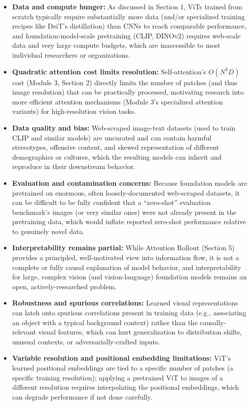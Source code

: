 \documentclass[12pt,a4paper]{article}
\begin{document}
\begin{itemize}[leftmargin=1.5em]
    \item \textbf{Data and compute hunger:} As discussed in Section 1, ViTs trained from scratch typically require substantially more data (and/or specialized training recipes like DeiT's distillation) than CNNs to reach comparable performance, and foundation-model-scale pretraining (CLIP, DINOv2) requires web-scale data and very large compute budgets, which are inaccessible to most individual researchers or organizations.
    \item \textbf{Quadratic attention cost limits resolution:} Self-attention's $O(N^2D)$ cost (Module 3, Section 2) directly limits the number of patches (and thus image resolution) that can be practically processed, motivating research into more efficient attention mechanisms (Module 3's specialized attention variants) for high-resolution vision tasks.
    \item \textbf{Data quality and bias:} Web-scraped image-text datasets (used to train CLIP and similar models) are uncurated and can contain harmful stereotypes, offensive content, and skewed representation of different demographics or cultures, which the resulting models can inherit and reproduce in their downstream behavior.
    \item \textbf{Evaluation and contamination concerns:} Because foundation models are pretrained on enormous, often loosely-documented web-scraped datasets, it can be difficult to be fully confident that a ``zero-shot'' evaluation benchmark's images (or very similar ones) were not already present in the pretraining data, which would inflate reported zero-shot performance relative to genuinely novel data.
    \item \textbf{Interpretability remains partial:} While Attention Rollout (Section 5) provides a principled, well-motivated view into information flow, it is not a complete or fully causal explanation of model behavior, and interpretability for large, complex vision (and vision-language) foundation models remains an open, actively-researched problem.
    \item \textbf{Robustness and spurious correlations:} Learned visual representations can latch onto spurious correlations present in training data (e.g., associating an object with a typical background context) rather than the causally-relevant visual features, which can hurt generalization to distribution shifts, unusual contexts, or adversarially-crafted inputs.
    \item \textbf{Variable resolution and positional embedding limitations:} ViT's learned positional embeddings are tied to a specific number of patches (a specific training resolution); applying a pretrained ViT to images of a different resolution requires interpolating the positional embeddings, which can degrade performance if not done carefully.
\end{itemize}
\end{document}
